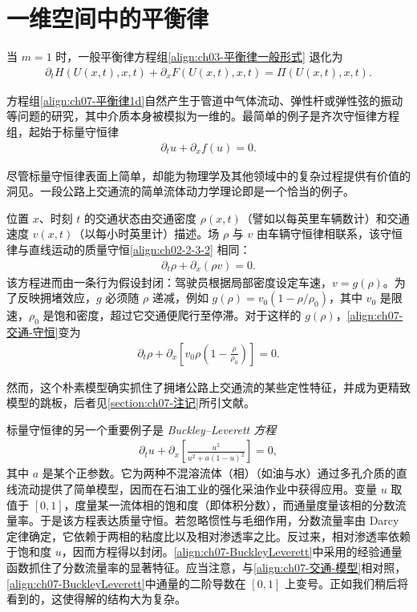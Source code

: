 \documentclass[../../main.tex]{subfiles}
\begin{document}
\section{一维空间中的平衡律}\label{section:ch07-一维平衡律}

当 $m=1$ 时，一般平衡律方程组\eqref{align:ch03-平衡律一般形式}
退化为
\begin{align}
\partial_t H(U(x,t),x,t)+\partial_x F(U(x,t),x,t)=\Pi(U(x,t),x,t).
\label{align:ch07-平衡律1d}
\end{align}

方程组\eqref{align:ch07-平衡律1d}自然产生于管道中气体流动、弹性杆或弹性弦的振动等问题的研究，其中介质本身被模拟为一维的。最简单的例子是齐次守恒律方程组，起始于标量守恒律
\begin{align}
\partial_t u+\partial_x f(u)=0.
\label{align:ch07-标量守恒律}
\end{align}

尽管标量守恒律表面上简单，却能为物理学及其他领域中的复杂过程提供有价值的洞见。一段公路上交通流的简单流体动力学理论即是一个恰当的例子。

位置 $x$、时刻 $t$ 的交通状态由交通密度 $\rho(x,t)$（譬如以每英里车辆数计）和交通速度 $v(x,t)$（以每小时英里计）描述。场 $\rho$ 与 $v$ 由车辆守恒律相联系，该守恒律与直线运动的质量守恒\eqref{align:ch02-2-3-2}
相同：
\begin{align}
\partial_t\rho+\partial_x(\rho v)=0.
\label{align:ch07-交通-守恒}
\end{align}
该方程进而由一条行为假设封闭：驾驶员根据局部密度设定车速，$v=g(\rho)$。为了反映拥堵效应，$g$ 必须随 $\rho$ 递减，例如 $g(\rho)=v_0(1-\rho/\rho_0)$，其中 $v_0$ 是限速，$\rho_0$ 是饱和密度，超过它交通便爬行至停滞。对于这样的 $g(\rho)$，\eqref{align:ch07-交通-守恒}变为
\begin{align}
\partial_t\rho+\partial_x\left[v_0\rho\left(1-\frac{\rho}{\rho_0}\right)\right]=0.
\label{align:ch07-交通-模型}
\end{align}

然而，这个朴素模型确实抓住了拥堵公路上交通流的某些定性特征，并成为更精致模型的跳板，后者见\cref{section:ch07-注记}所引文献。


标量守恒律的另一个重要例子是 \emph{Buckley--Leverett 方程}
\begin{align}
\partial_t u+\partial_x\left[\frac{u^2}{u^2+a(1-u)^2}\right]=0,
\label{align:ch07-BuckleyLeverett}
\end{align}
其中 $a$ 是某个正参数。它为两种不混溶流体（相）（如油与水）通过多孔介质的直线流动提供了简单模型，因而在石油工业的强化采油作业中获得应用。变量 $u$ 取值于 $[0,1]$，度量某一流体相的饱和度（即体积分数），而通量度量该相的分数流量率。于是该方程表达质量守恒。若忽略惯性与毛细作用，分数流量率由 Darcy 定律确定，它依赖于两相的粘度比以及相对渗透率之比。反过来，相对渗透率依赖于饱和度 $u$，因而方程得以封闭。\eqref{align:ch07-BuckleyLeverett}中采用的经验通量函数抓住了分数流量率的显著特征。应当注意，与\eqref{align:ch07-交通-模型}相对照，\eqref{align:ch07-BuckleyLeverett}中通量的二阶导数在 $[0,1]$ 上变号。正如我们稍后将看到的，这使得解的结构大为复杂。
\end{document}
